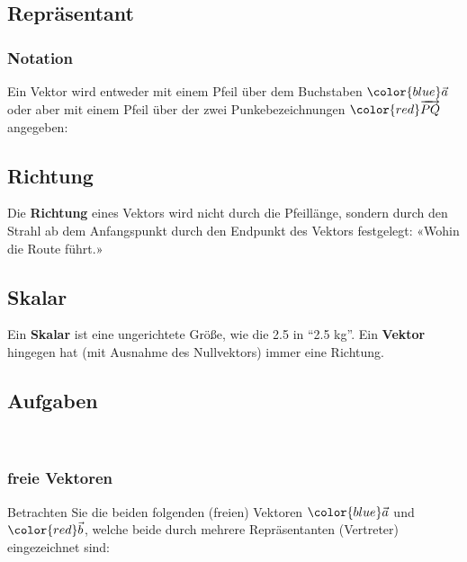 \newpage
\subsection{Repräsentant}

\subsubsection{Notation}

Ein Vektor wird entweder mit einem Pfeil über dem Buchstaben
${\color{blue}\vec{a}}$ oder aber mit einem Pfeil über der zwei
Punkebezeichnungen ${\color{red}\overrightarrow{{PQ}}}$ angegeben:



\subsection{Richtung}
Die \textbf{Richtung} eines Vektors wird nicht durch die Pfeillänge,
sondern durch den Strahl ab dem Anfangspunkt durch den Endpunkt des
Vektors festgelegt: «Wohin die Route führt.»


\subsection{Skalar}
Ein \textbf{Skalar} ist eine ungerichtete Größe, wie \zB die 2.5 in
``2.5 kg''.
Ein \textbf{Vektor} hingegen hat (mit Ausnahme des Nullvektors) immer
eine Richtung.

\subsection*{Aufgaben}\

\newpage



\subsubsection{freie Vektoren}
Betrachten Sie die beiden folgenden (freien) Vektoren ${\color{blue} \vec{a}}$ und
${\color{red}\vec{b}}$, welche beide durch mehrere Repräsentanten
(Vertreter\index{Vertreter!Vektor}) eingezeichnet sind:

